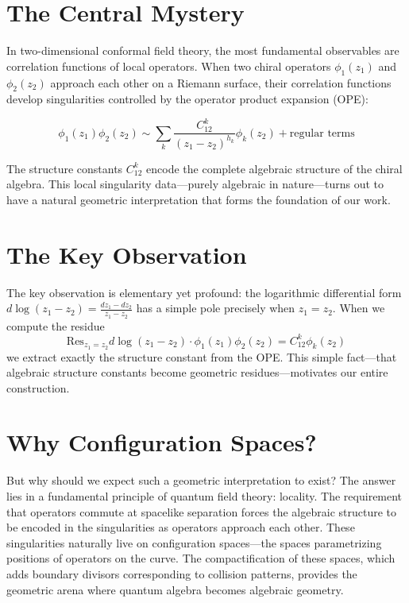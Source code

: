 \section{The Central Mystery}

In two-dimensional conformal field theory, the most fundamental observables are correlation functions of local operators. When two chiral operators $\phi_1(z_1)$ and $\phi_2(z_2)$ approach each other on a Riemann surface, their correlation functions develop singularities controlled by the operator product expansion (OPE):

$$\phi_1(z_1) \phi_2(z_2) \sim \sum_k \frac{C^k_{12}}{(z_1 - z_2)^{h_k}} \phi_k(z_2) + \text{regular terms}$$

The structure constants $C^k_{12}$ encode the complete algebraic structure of the chiral algebra. This local singularity data—purely algebraic in nature—turns out to have a natural geometric interpretation that forms the foundation of our work.

\section{The Key Observation}

The key observation is elementary yet profound: the logarithmic differential form $d\log(z_1 - z_2) = \frac{dz_1 - dz_2}{z_1 - z_2}$ has a simple pole precisely when $z_1 = z_2$. When we compute the residue
$$\text{Res}_{z_1=z_2} d\log(z_1 - z_2) \cdot \phi_1(z_1)\phi_2(z_2) = C^k_{12} \phi_k(z_2)$$
we extract exactly the structure constant from the OPE. This simple fact—that algebraic structure constants become geometric residues—motivates our entire construction.

\section{Why Configuration Spaces?}

But why should we expect such a geometric interpretation to exist? The answer lies in a fundamental principle of quantum field theory: locality. The requirement that operators commute at spacelike separation forces the algebraic structure to be encoded in the singularities as operators approach each other. These singularities naturally live on configuration spaces—the spaces parametrizing positions of operators on the curve. The compactification of these spaces, which adds boundary divisors corresponding to collision patterns, provides the geometric arena where quantum algebra becomes algebraic geometry.

